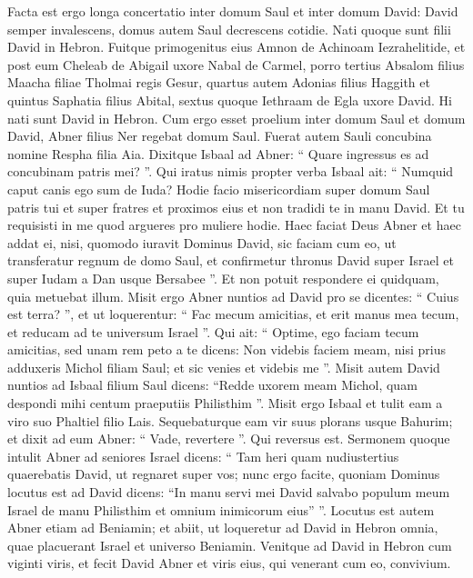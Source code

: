 \begin{biblechapter}
\begin{biblechapter}
\begin{biblechapter}
\verse Facta est ergo longa concertatio inter domum Saul et inter domum David: David semper invalescens, domus autem Saul decrescens cotidie.
 \verse Nati quoque sunt filii David in Hebron. Fuitque primogenitus eius Amnon de Achinoam Iezrahelitide, 
\verse et post eum Cheleab de Abigail uxore Nabal de Carmel, porro tertius Absalom filius Maacha filiae Tholmai regis Gesur, 
\verse quartus autem Adonias filius Haggith et quintus Saphatia filius Abital, 
\verse sextus quoque Iethraam de Egla uxore David. Hi nati sunt David in Hebron.
 \verse Cum ergo esset proelium inter domum Saul et domum David, Abner filius Ner regebat domum Saul. 
\verse Fuerat autem Sauli concubina nomine Respha filia Aia. Dixitque Isbaal ad Abner: 
\verse “ Quare ingressus es ad concubinam patris mei? ”. Qui iratus nimis propter verba Isbaal ait: “ Numquid caput canis ego sum de Iuda? Hodie facio misericordiam super domum Saul patris tui et super fratres et proximos eius et non tradidi te in manu David. Et tu requisisti in me quod argueres pro muliere hodie. 
\verse Haec faciat Deus Abner et haec addat ei, nisi, quomodo iuravit Dominus David, sic faciam cum eo, 
\verse ut transferatur regnum de domo Saul, et confirmetur thronus David super Israel et super Iudam a Dan usque Bersabee ”. 
\verse Et non potuit respondere ei quidquam, quia metuebat illum.
 \verse Misit ergo Abner nuntios ad David pro se dicentes: “ Cuius est terra? ”, et ut loquerentur: “ Fac mecum amicitias, et erit manus mea tecum, et reducam ad te universum Israel ”. 
\verse Qui ait: “ Optime, ego faciam tecum amicitias, sed unam rem peto a te dicens: Non videbis faciem meam, nisi prius adduxeris Michol filiam Saul; et sic venies et videbis me ”. 
\verse Misit autem David nuntios ad Isbaal filium Saul dicens: “Redde uxorem meam Michol, quam despondi mihi centum praeputiis Philisthim ”. 
\verse Misit ergo Isbaal et tulit eam a viro suo Phaltiel filio Lais. 
\verse Sequebaturque eam vir suus plorans usque Bahurim; et dixit ad eum Abner: “ Vade, revertere ”. Qui reversus est.
 \verse Sermonem quoque intulit Abner ad seniores Israel dicens: “ Tam heri quam nudiustertius quaerebatis David, ut regnaret super vos; 
\verse nunc ergo facite, quoniam Dominus locutus est ad David dicens: “In manu servi mei David salvabo populum meum Israel de manu Philisthim et omnium inimicorum eius” ”. 
\verse Locutus est autem Abner etiam ad Beniamin; et abiit, ut loqueretur ad David in Hebron omnia, quae placuerant Israel et universo Beniamin. 
\verse Venitque ad David in Hebron cum viginti viris, et fecit David Abner et viris eius, qui venerant cum eo, convivium. 

\end{biblechapter}
\end{biblechapter}
\end{biblechapter}
